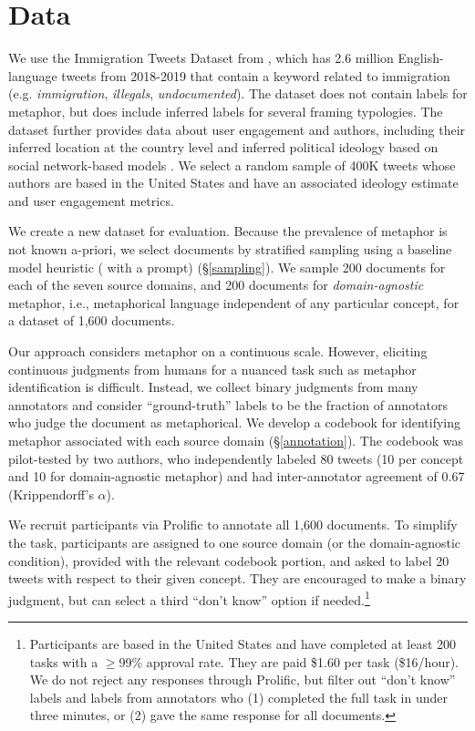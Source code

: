 \section{Data}

We use the Immigration Tweets Dataset from \citet{mendelsohn2021modeling}, which has 2.6 million English-language tweets from 2018-2019 that contain a keyword related to immigration (e.g. \textit{immigration}, \textit{illegals}, \textit{undocumented}). The dataset does not contain labels for metaphor, but does include inferred labels for several framing typologies. The dataset further provides data about user engagement and authors, including their inferred location at the country level and inferred political ideology based on social network-based models \citep{compton2014geotagging,Barbera2015}. We select a random sample of 400K tweets whose authors are based in the United States and have an associated ideology estimate and user engagement metrics. 



We create a new dataset for evaluation. Because the prevalence of metaphor is not known a-priori, we select documents by stratified sampling using a baseline model heuristic ( with a  prompt) (§\ref{sampling}). We sample 200 documents for each of the seven source domains, and 200 documents for \textit{domain-agnostic} metaphor, i.e., metaphorical language independent of any particular concept, for a dataset of 1,600 documents.

Our approach considers metaphor on a continuous scale. However, eliciting continuous judgments from humans for a nuanced task such as metaphor identification is difficult. Instead, we collect binary judgments from many annotators and consider ``ground-truth'' labels to be the fraction of annotators who judge the document as metaphorical. We develop a codebook for identifying metaphor associated with each source domain (§\ref{annotation}). The codebook was pilot-tested by two authors, who independently labeled 80 tweets (10 per concept and 10 for domain-agnostic metaphor) and had inter-annotator agreement of 0.67 (Krippendorff's $\alpha$).

We recruit participants via Prolific to annotate all 1,600 documents. To simplify the task, participants are assigned to one source domain (or the domain-agnostic condition), provided with the relevant codebook portion, and asked to label 20 tweets with respect to their given concept. They are encouraged to make a binary judgment, but can select a third  ``don't know'' option if needed.\footnote{Participants are based in the United States and have completed at least 200 tasks with a $\geq$99\% approval rate. They are paid \$1.60 per task (\$16/hour). We do not reject any responses through Prolific, but filter out ``don't know'' labels and labels from annotators who (1) completed the full task in under three minutes, or (2) gave the same response for all documents.}

